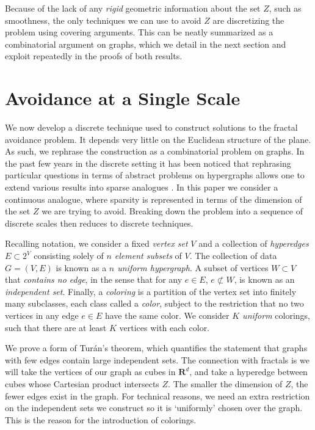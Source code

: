 \documentclass{article}
\theoremstyle{plain}
\theoremstyle{plain}
\begin{document}
\begin{multicols}{2}
Because of the lack of any {\it rigid} geometric information about the set $Z$, such as smoothness, the only techniques we can use to avoid $Z$ are discretizing the problem using covering arguments. This can be neatly summarized as a combinatorial argument on graphs, which we detail in the next section and exploit repeatedly in the proofs of both results.



\section{Avoidance at a Single Scale}

We now develop a discrete technique used to construct solutions to the fractal avoidance problem. It depends very little on the Euclidean structure of the plane. As such, we rephrase the construction as a combinatorial problem on graphs. In the past few years in the discrete setting it has been noticed that rephrasing particular questions in terms of abstract problems on hypergraphs allows one to extend various results into sparse analogues \cite{BaloghMorrisSamotij}. In this paper we consider a continuous analogue, where sparsity is represented in terms of the dimension of the set $Z$ we are trying to avoid. Breaking down the problem into a sequence of discrete scales then reduces to discrete techniques.


Recalling notation, we consider a fixed {\it vertex set} $V$ and a collection of {\it hyperedges} $E \subset 2^V$ consisting solely of {\it $n$ element subsets} of $V$. The collection of data $G = (V,E)$ is known as a {\it $n$ uniform hypergraph}. A subset of vertices $W \subset V$ that {\it contains no edge}, in the sense that for any $e \in E$, $e \not \subset W$, is known as an {\it independent set}. Finally, a {\it coloring} is a partition of the vertex set into finitely many subclasses, each class called a {\it color}, subject to the restriction that no two vertices in any edge $e \in E$ have the same color. We consider {\it $K$ uniform} colorings, such that there are at least $K$ vertices with each color.

We prove a form of Tur\'{a}n's theorem, which quantifies the statement that graphs with few edges contain large independent sets. The connection with fractals is we will take the vertices of our graph as cubes in $\mathbf{R}^d$, and take a hyperedge between cubes whose Cartesian product intersects $Z$. The smaller the dimension of $Z$, the fewer edges exist in the graph. For technical reasons, we need an extra restriction on the independent sets we construct so it is `uniformly' chosen over the graph. This is the reason for the introduction of colorings.


\end{multicols}
\end{document}
